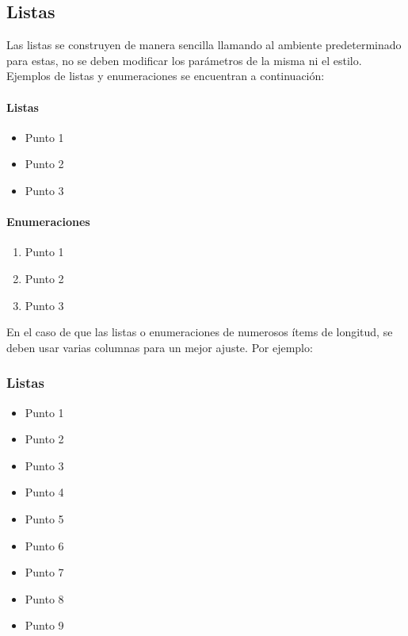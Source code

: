 \documentclass{aleph-revista}
\begin{document}
\subsection{Listas}

Las listas se construyen de manera sencilla llamando al ambiente predeterminado para estas, no se deben modificar los parámetros de la misma ni el estilo. Ejemplos de listas y enumeraciones se encuentran a continuación:

\begin{multicols}{2}
\paragraph{Listas}
\begin{itemize} 
    \item Punto 1
    \item Punto 2
    \item Punto 3
\end{itemize}

\paragraph{Enumeraciones}
\begin{enumerate} 
    \item Punto 1
    \item Punto 2
    \item Punto 3
\end{enumerate}

\end{multicols}

En el caso de que las listas o enumeraciones de numerosos ítems de longitud, se deben usar varias columnas para un mejor ajuste. Por ejemplo:

\subsubsection{Listas} 

\begin{multicols}{3}
\begin{itemize} 
    \item Punto 1
    \item Punto 2
    \item Punto 3
    \item Punto 4
    \item Punto 5
    \item Punto 6
    \item Punto 7
    \item Punto 8
    \item Punto 9
\end{itemize}
\end{multicols}
\end{document}
